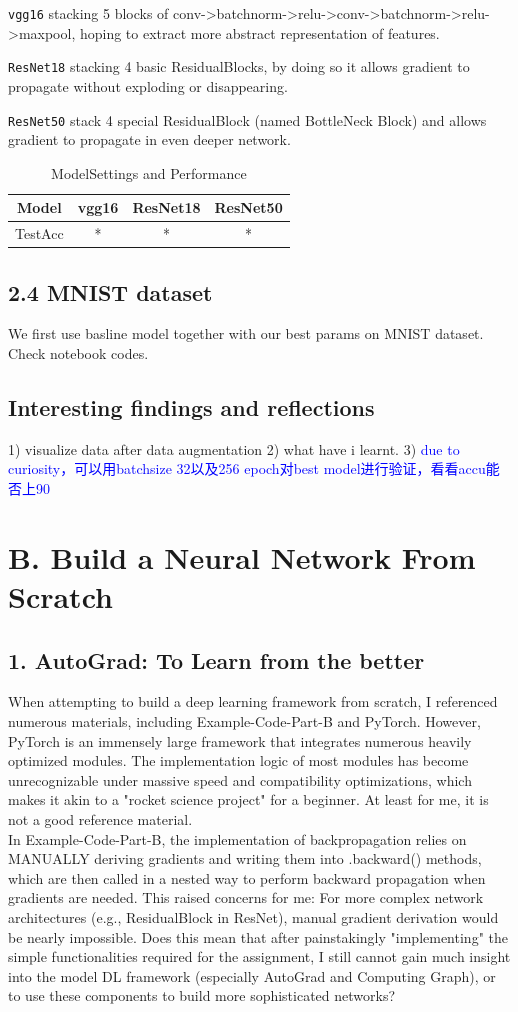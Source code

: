 \documentclass{article}
\newcommand{\subs}[1]{\subsection*{#1}}
\newcommand{\secs}[1]{\section*{#1}}
\begin{document}
\texttt{vgg16} stacking 5 blocks of conv->batchnorm->relu->conv->batchnorm->relu->maxpool, hoping to extract more abstract representation of features.

\texttt{ResNet18} stacking 4 basic ResidualBlocks, by doing so it allows gradient to propagate without exploding or disappearing.

\texttt{ResNet50} stack 4 special ResidualBlock (named BottleNeck Block) and allows gradient to propagate in even deeper network.

\begin{table}[htbp]
  \centering
  \caption{ModelSettings and Performance}
  \label{tab:model-compare}
  \begin{tabular}{|c|ccc|} 
    \hline
    Model & vgg16 & ResNet18 & ResNet50  \\
    \hline
    TestAcc & * & * & *  \\
    \hline
  \end{tabular} 
\end{table}






\subs{2.4 MNIST dataset}
We first use basline model together with our best params on MNIST dataset. Check notebook codes.


\subs{Interesting findings and reflections}
1) visualize data after data augmentation
2) what have i learnt.
3) \textcolor{blue}{due to curiosity，可以用batchsize 32以及256 epoch对best model进行验证，看看accu能否上90}

\newpage
\secs{B. Build a Neural Network From Scratch}
\subs{1. AutoGrad: To Learn from the better}
When attempting to build a deep learning framework from scratch, I referenced numerous materials, including Example-Code-Part-B and PyTorch. However, PyTorch is an immensely large framework that integrates numerous heavily optimized modules. The implementation logic of most modules has become unrecognizable under massive speed and compatibility optimizations, which makes it akin to a "rocket science project" for a beginner. At least for me, it is not a good reference material.\\

In Example-Code-Part-B, the implementation of backpropagation relies on MANUALLY deriving gradients and writing them into .backward() methods, which are then called in a nested way to perform backward propagation when gradients are needed. This raised concerns for me: For more complex network architectures (e.g., ResidualBlock in ResNet), manual gradient derivation would be nearly impossible. Does this mean that after painstakingly "implementing" the simple functionalities required for the assignment, I still cannot gain much insight into the model DL framework (especially AutoGrad and Computing Graph), or to use these components to build more sophisticated networks?\\
\end{document}

